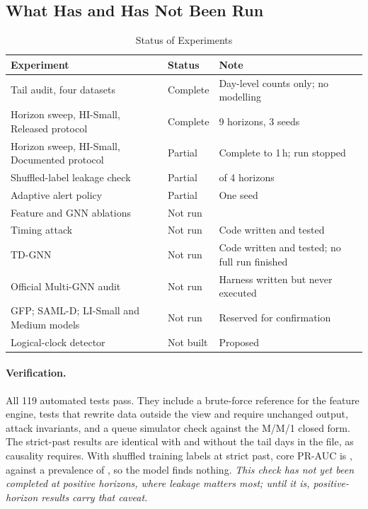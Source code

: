 \documentclass[11pt,a4paper]{article}
\begin{document}
\subsection{What Has and Has Not Been Run}
\begin{table}[htbp]
\centering
\small
\caption{Status of Experiments}
\label{tab:prelim_status}
\begin{tabularx}{\textwidth}{L{5.4cm} L{2.2cm} X}
\toprule
\textbf{Experiment} & \textbf{Status} & \textbf{Note} \\
\midrule
Tail audit, four datasets & Complete & Day-level counts only; no modelling \\
Horizon sweep, HI-Small, Released protocol & Complete & 9 horizons, 3 seeds \\
Horizon sweep, HI-Small, Documented protocol & Partial & Complete to 1\,h; run stopped \\
Shuffled-label leakage check & Partial & \SanityHorizonsDone{} of 4 horizons \\
Adaptive alert policy & Partial & One seed \\
Feature and GNN ablations & Not run & \\
Timing attack & Not run & Code written and tested \\
TD-GNN & Not run & Code written and tested; no full run finished \\
Official Multi-GNN audit & Not run & Harness written but never executed \\
GFP; SAML-D; LI-Small and Medium models & Not run & Reserved for confirmation \\
Logical-clock detector & Not built & Proposed \\
\bottomrule
\end{tabularx}
\end{table}

\paragraph{Verification.} All 119 automated tests pass. They include a brute-force reference for the feature engine, tests that rewrite data outside the view and require unchanged output, attack invariants, and a queue simulator check against the M/M/1 closed form. The strict-past results are identical with and without the tail days in the file, as causality requires. With shuffled training labels at strict past, core PR-AUC is \SanityShuffledStrict{}, against a prevalence of \SanityPrev{}, so the model finds nothing. \emph{This check has not yet been completed at positive horizons, where leakage matters most; until it is, positive-horizon results carry that caveat.}
\end{document}
